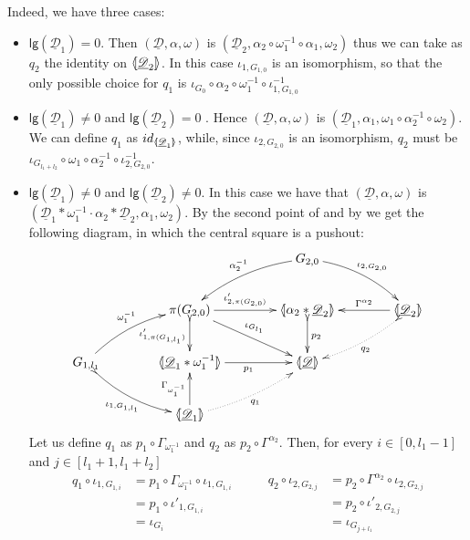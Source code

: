 \documentclass[a4paper,UKenglish,cleveref,pdftex, thm-restate,numberwithinsect]{lipics}
\newcommand{\id}[1]{\mathsf{id}_{#1}}
\newcommand{\dder}[1]{\mathscr{#1}}
\newcommand{\der}[1]{\underline{\dder{#1}}}
\newcommand{\lpro}{\langle \hspace{-1.85pt}[}
\newcommand{\rpro}{]\hspace{-1.85pt}\rangle}
\newcommand{\tpro}[1]{\lpro \der{#1}\rpro}
\newcommand{\tproi}[2]{\lpro \der{#1}_{#2}\rpro}
\newcommand{\lgh}[0]{\mathsf{lg}}
\begin{document}
\begin{remark}
	Indeed, we have three cases:
	\begin{itemize}
		\item $\lgh(\der{D}_1)=0$. Then  $(\der{D}, \alpha, \omega)$ is $(\der{D}_2, \alpha_2\circ \omega_1^{-1}\circ \alpha_1, \omega_2)$ thus we can take as $q_2$ the identity on $\lpro \der{D}_2\rpro$. In this case $\iota_{1,G_{1,0}}$ is an isomorphism, so that the only possible choice for $q_1$ is $\iota_{G_0}\circ \alpha_2\circ \omega^{-1}_1 \circ \iota^{-1}_{1,G_{1,0}}$
		\item $\lgh(\der{D}_1)\neq 0$ and $\lgh(\der{D}_2)=0$ . Hence  $(\der{D}, \alpha, \omega)$ is $(\der{D}_1, \alpha_1, \omega_1 \circ \alpha^{-1}_2\circ \omega_2)$. We can define $q_1$ as $\id{\lpro \der{D}_1\rpro}$, while, since $\iota_{2,G_{2,0}}$ is an isomorphism, $q_2$ must be  $\iota_{G_{l_1+l_2}}\circ  \omega_1  \circ \alpha^{-1}_2 \circ \iota^{-1}_{2,G_{2,0}}$.
		\item  $\lgh(\der{D}_1)\neq 0$ and $\lgh(\der{D}_2)\neq 0$. In this case we have that $(\der{D}, \alpha, \omega)$  is $(\der{D}_1*\omega_1^{-1}\cdot \alpha_2*\der{D}_2, \alpha_1, \omega_2)$. By the second point of  and by  we get the following diagram, in which the central square is a pushout:
			\[\xymatrix@C=40pt{&&G_{2,0}  \ar@/_.3cm/[dl]_{\alpha^{-1}_2} \ar@/^.3cm/[dr]^{\iota_{2, G_{2,0}}}\\&\pi(G_{2,0}) \ar[dr]^{\iota_{G_{l_1}}}\ar[r]^-{\iota'_{2, \pi(G_{2,0})}} \ar@{>->}[d]_-{\iota'_{1, \pi(G_{1,l_1})}} & \lpro \alpha_2*\der{D}_2 \rpro \ar@{>->}[d]^{p_2} &\tproi{D}{2} \ar[l]_-{\Gamma^{\alpha_2}} \ar@{>.>}@/^.2cm/[dl]^{q_2}\\ G_{1,l_1}  \ar@/^.3cm/[ur]^{\omega^{-1}_1}  \ar@{>->}@/_.3cm/[dr]_{\iota_{1, G_{1, l_1}}}& \lpro \der{D}_1*\omega_1^{-1} \rpro  \ar[r]_{p_1}& \tpro{D} \\ &\tproi{D}{1} \ar[u]^{\Gamma_{\omega^{-1}_1}}  \ar@{.>}@/_.2cm/[ur]_{q_1}}\]
			Let us define $q_1$ as $p_1\circ \Gamma_{\omega^{-1}_1}$ and $q_2$ as $p_2\circ \Gamma^{\alpha_2}$. Then, for every $i\in [0,l_1-1]$ and $j\in [l_1+1, l_1+l_2]$
				\[\begin{split}
		q_1\circ \iota_{1, G_{1,i}}&=p_1\circ \Gamma_{\omega^{-1}_1}\circ \iota_{1, G_{1,i}}\\&=p_1\circ \iota'_{1, G_{1,i}} \\&=\iota_{G_{i}}
		\end{split} \qquad \begin{split}
			q_2\circ \iota_{2, G_{2,j}}&=p_2\circ \Gamma^{\alpha_2}\circ \iota_{2, G_{2,j}}\\&=p_2\circ \iota'_{2, G_{2,j}} \\&=\iota_{G_{j+l_1}}

\end{split}\]
\end{itemize}
\end{remark}
\end{document}
